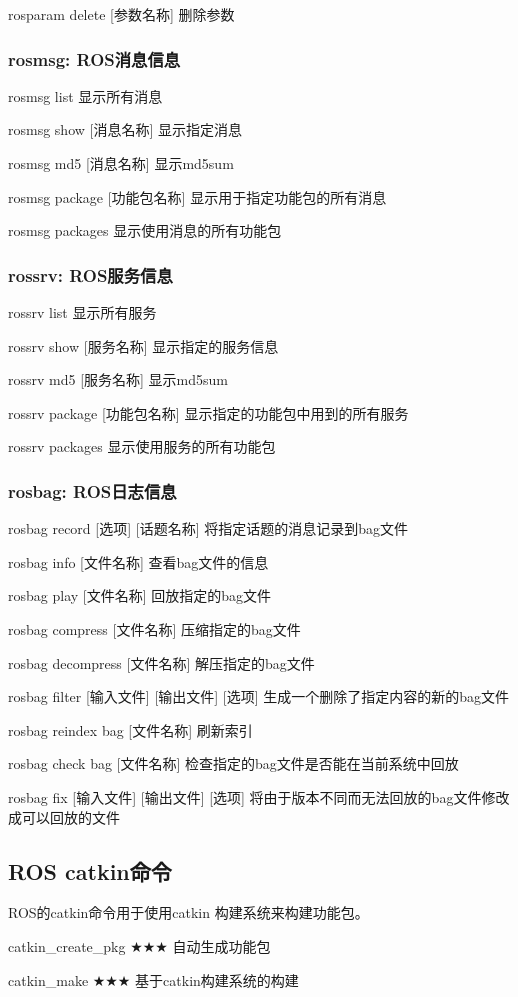 \documentclass[geye,green,kindle,cn]{elegantnote}
\begin{document}
rosparam delete [参数名称] 删除参数 
\subsubsection{rosmsg: ROS消息信息}
rosmsg list 显示所有消息 

rosmsg show [消息名称] 显示指定消息 

rosmsg md5 [消息名称] 显示md5sum 

rosmsg package [功能包名称] 显示用于指定功能包的所有消息 

rosmsg packages 显示使用消息的所有功能包  
\subsubsection{rossrv: ROS服务信息}
rossrv list 显示所有服务 

rossrv show [服务名称] 显示指定的服务信息 

rossrv md5 [服务名称] 显示md5sum 

rossrv package [功能包名称] 显示指定的功能包中用到的所有服务 

rossrv packages 显示使用服务的所有功能包 
\subsubsection{rosbag: ROS日志信息}
rosbag record [选项] [话题名称] 将指定话题的消息记录到bag文件 

rosbag info [文件名称] 查看bag文件的信息 

rosbag play [文件名称] 回放指定的bag文件 

rosbag compress [文件名称] 压缩指定的bag文件 

rosbag decompress [文件名称] 解压指定的bag文件 

rosbag filter [输入文件] [输出文件] [选项] 生成一个删除了指定内容的新的bag文件 

rosbag reindex bag [文件名称] 刷新索引 

rosbag check bag [文件名称] 检查指定的bag文件是否能在当前系统中回放 

rosbag fix [输入文件] [输出文件] [选项] 将由于版本不同而无法回放的bag文件修改成可以回放的文件
\subsection{ROS catkin命令}
ROS的catkin命令用于使用catkin 构建系统来构建功能包。

catkin\_create\_pkg ★★★ 自动生成功能包

catkin\_make ★★★ 基于catkin构建系统的构建 
\end{document}
